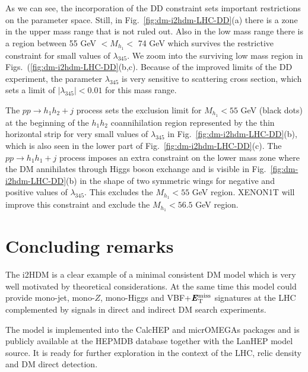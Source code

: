 \documentclass[12pt,a4paper]{article}
\newcommand {\red} {\color{red}}
\newcommand{\MET}{\textbf{\textit{E}$_{\rm T}^{\rm miss}$}}
\begin{document}
As we can see, the incorporation of the DD constraint sets important restrictions on the parameter space. Still, in Fig.~\ref{fig:dm-i2hdm-LHC-DD}(a) there is a zone in the upper mass range that is not ruled out. Also in the low mass range there is a region between 55 GeV $< M_{h_1} <$ 74 GeV
which survives the restrictive constraint for small values of $\lambda_{345}$. We zoom into the surviving low mass region in Figs.~(\ref{fig:dm-i2hdm-LHC-DD}(b,c). Because of the improved limits of the DD experiment, the parameter $\lambda_{345}$ is very sensitive to scattering cross section, 
which sets a limit of $|\lambda_{345}|<0.01$ for this mass range.

The $pp \to h_1h_2+j$ process sets the exclusion limit for $M_{h_1}<55$ GeV (black dots) at the beginning of the $h_1 h_2$ coannihilation region represented by the thin horizontal strip for very small values of $\lambda_{345}$ in Fig.~\ref{fig:dm-i2hdm-LHC-DD}(b), which is also seen in the lower part of Fig.~\ref{fig:dm-i2hdm-LHC-DD}(c). The $pp \to h_1 h_1 + j$ process imposes an extra constraint on the lower mass zone where the DM annihilates through Higgs boson exchange and is visible in Fig.~\ref{fig:dm-i2hdm-LHC-DD}(b) in the shape of two symmetric wings for negative and positive values of $\lambda_{345}$. This excludes the $M_{h_1}<55$ GeV region. XENON1T will improve this constraint and exclude the $M_{h_1}<56.5$ GeV region.

%
\section{Concluding remarks}


The i2HDM is a clear example of a minimal consistent DM model which is
very well motivated by theoretical considerations.
At the same time this model could provide
 mono-jet, mono-$Z$, mono-Higgs and VBF+$\MET{}$
signatures at the LHC
complemented by
signals in direct and indirect DM search experiments.

The model is implemented into the CalcHEP and micrOMEGAs packages
and is publicly available at the HEPMDB database together with the
LanHEP model source. It is ready for further
exploration in the context of the LHC, relic density and DM direct detection.
\end{document}

